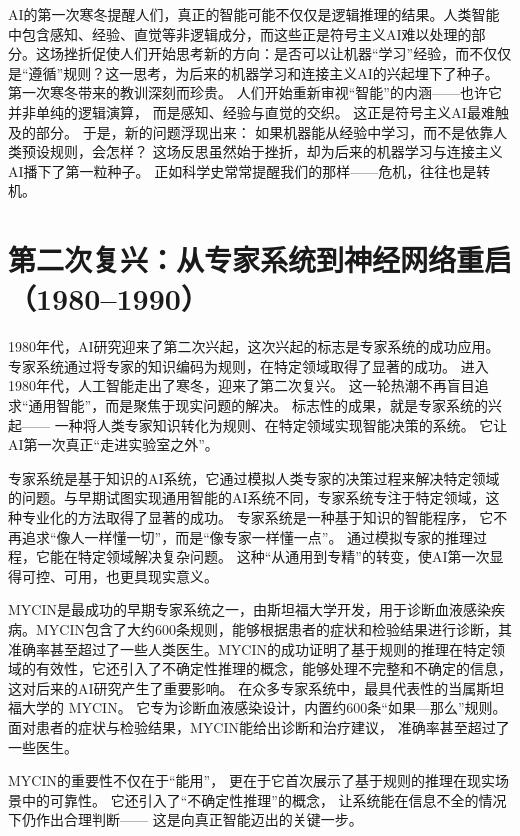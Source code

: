 AI的第一次寒冬提醒人们，真正的智能可能不仅仅是逻辑推理的结果。人类智能中包含感知、经验、直觉等非逻辑成分，而这些正是符号主义AI难以处理的部分。这场挫折促使人们开始思考新的方向：是否可以让机器“学习”经验，而不仅仅是“遵循”规则？这一思考，为后来的机器学习和连接主义AI的兴起埋下了种子。
第一次寒冬带来的教训深刻而珍贵。  
人们开始重新审视“智能”的内涵——也许它并非单纯的逻辑演算，  
而是感知、经验与直觉的交织。  
这正是符号主义AI最难触及的部分。  
于是，新的问题浮现出来：  
如果机器能从经验中学习，而不是依靠人类预设规则，会怎样？  
这场反思虽然始于挫折，却为后来的机器学习与连接主义AI播下了第一粒种子。  
正如科学史常常提醒我们的那样——危机，往往也是转机。  

\section{第二次复兴：从专家系统到神经网络重启（1980–1990）}

1980年代，AI研究迎来了第二次兴起，这次兴起的标志是专家系统的成功应用。专家系统通过将专家的知识编码为规则，在特定领域取得了显著的成功。
进入1980年代，人工智能走出了寒冬，迎来了第二次复兴。  
这一轮热潮不再盲目追求“通用智能”，而是聚焦于现实问题的解决。  
标志性的成果，就是专家系统的兴起——  
一种将人类专家知识转化为规则、在特定领域实现智能决策的系统。  
它让AI第一次真正“走进实验室之外”。  

专家系统是基于知识的AI系统，它通过模拟人类专家的决策过程来解决特定领域的问题。与早期试图实现通用智能的AI系统不同，专家系统专注于特定领域，这种专业化的方法取得了显著的成功。
专家系统是一种基于知识的智能程序，  
它不再追求“像人一样懂一切”，而是“像专家一样懂一点”。  
通过模拟专家的推理过程，它能在特定领域解决复杂问题。  
这种“从通用到专精”的转变，使AI第一次显得可控、可用，也更具现实意义。  

MYCIN是最成功的早期专家系统之一，由斯坦福大学开发，用于诊断血液感染疾病。MYCIN包含了大约600条规则，能够根据患者的症状和检验结果进行诊断，其准确率甚至超过了一些人类医生。MYCIN的成功证明了基于规则的推理在特定领域的有效性，它还引入了不确定性推理的概念，能够处理不完整和不确定的信息，这对后来的AI研究产生了重要影响。
在众多专家系统中，最具代表性的当属斯坦福大学的 MYCIN。  
它专为诊断血液感染设计，内置约600条“如果—那么”规则。  
面对患者的症状与检验结果，MYCIN能给出诊断和治疗建议，  
准确率甚至超过了一些医生。  

MYCIN的重要性不仅在于“能用”，  
更在于它首次展示了基于规则的推理在现实场景中的可靠性。  
它还引入了“不确定性推理”的概念，  
让系统能在信息不全的情况下仍作出合理判断——  
这是向真正智能迈出的关键一步。  

